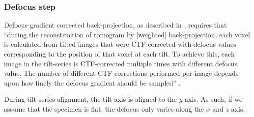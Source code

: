 \subsubsection{Defocus step} \label{sec:algo:ctf_3d:defocus_step}

Defocus-gradient corrected back-projection, as described in \cite{jensen_3dctf}, requires that ``during the reconstruction of tomogram by [weighted] back-projection, each voxel is calculated from tilted images that were CTF-corrected with defocus values corresponding to the position of that voxel at each tilt. To achieve this, each image in the tilt-series is CTF-corrected multiple times with different defocus value. The number of different CTF corrections performed per image depends upon how finely the defocus gradient should be sampled'' \cite{novaCTF}.

\begin{note}During tilt-series alignment, the tilt axis is aligned to the $y$ axis. As such, if we assume that the specimen is flat, the defocus only varies along the $x$ and $z$ axis.
\end{note}

